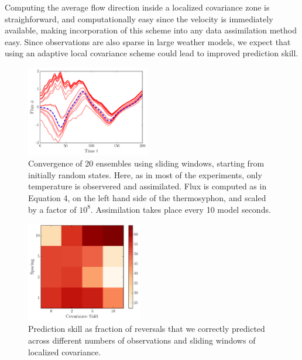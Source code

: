 Computing the average flow direction inside a localized covariance zone is straighforward, and computationally easy since the velocity is immediately available, making incorporation of this scheme into any data assimilation method easy.
Since observations are also sparse in large weather models, we expect that using an adaptive local covariance scheme could lead to improved prediction skill.

\begin{figure}[t]
  \centering
  \includegraphics[width=0.48\textwidth]{../figures/2015-09-30-15-48-loop-spaghetti.pdf}
  \caption[]{
    Convergence of 20 ensembles using sliding windows, starting from initially random states.
    Here, as in most of the experiments, only temperature is observered and assimilated.
    Flux is computed as in Equation 4, on the left hand side of the thermosyphon, and scaled by a factor of $10^8$.
    Assimilation takes place every 10 model seconds.
  }
  \label{fig:sliding_spag}
\end{figure}

\begin{figure}[t]
  \centering
  \includegraphics[width=0.45\textwidth]{../figures/2015-09-30-19-59-consuela-2.pdf}
  \caption[]{
    Prediction skill as fraction of reversals that we correctly predicted across different numbers of observations and sliding windows of localized covariance.
  }
  \label{fig:sliding_results}
\end{figure}

